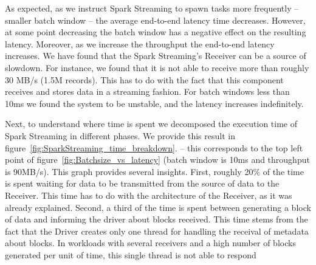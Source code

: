 As expected, as we instruct Spark Streaming to spawn tasks more frequently -- smaller batch window -- the average end-to-end latency time decreases.
However, at some point decreasing the batch window has a negative effect on the resulting latency.
Moreover, as we increase the throughput the end-to-end latency increases.
We have found that the Spark Streaming's Receiver can be a source of slowdown.
For instance, we found that it is not able to receive more than roughly 30 MB/s (1.5M records).
This has to do with the fact that this component receives and stores data in a streaming fashion.
For batch windows less than 10ms we found the system to be unstable, and the latency increases indefinitely.

Next, to understand where time is spent we decomposed the execution time of Spark Streaming in different phases.
We provide this result in figure~\ref{fig:SparkStreaming_time_breakdown}. 
-- this corresponds to the top left point of figure~\ref{fig:Batchsize_vs_latency} (batch window is 10ms and throughput is 90MB/s).
This graph provides several insights. First, roughly 20\% of the time is spent waiting for data to be transmitted from the source of data to the Receiver.
This time has to do with the architecture of the Receiver, as it was already explained.
Second, a third of the time is spent between generating a block of data and informing the driver about blocks received.
This time stems from the fact that the Driver creates only one thread for handling the receival of metadata about blocks.
In workloads with several receivers and a high number of blocks generated per unit of time, this single thread is not able to respond 
